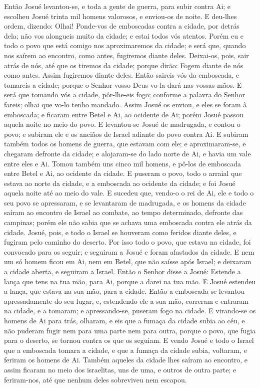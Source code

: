 Então Josué levantou-se, e toda a gente de guerra, para subir
contra Ai; e escolheu Josué trinta mil homens valorosos, e enviou-os
de noite. E deu-lhes ordem, dizendo: Olhai! Ponde-vos de
emboscadas contra a cidade, por detrás dela; não vos alongueis muito
da cidade; e estai todos vós atentos. Porém eu e todo o povo que
está comigo nos aproximaremos da cidade; e será que, quando nos
saírem ao encontro, como antes, fugiremos diante deles.
Deixai-os, pois, sair atrás de nós, até que os tiremos da
cidade; porque dirão: Fogem diante de nós como antes. Assim
fugiremos diante deles. Então saireis vós da emboscada, e
tomareis a cidade; porque o Senhor vosso Deus vo-la dará nas vossas
mãos. E será que tomando vós a cidade, pôr-lhe-eis fogo;
conforme a palavra do Senhor fareis; olhai que vo-lo tenho mandado.
Assim Josué os enviou, e eles se foram à emboscada; e ficaram
entre Betel e Ai, ao ocidente de Ai; porém Josué passou aquela noite
no meio do povo. E levantou-se Josué de madrugada, e contou o
povo; e subiram ele e os anciãos de Israel adiante do povo contra
Ai. E subiram também todos os homens de guerra, que estavam
com ele; e aproximaram-se, e chegaram defronte da cidade; e
alojaram-se do lado norte de Ai, e havia um vale entre eles e Ai.
Tomou também uns cinco mil homens, e pô-los de emboscada
entre Betel e Ai, ao ocidente da cidade. E puseram o povo,
todo o arraial que estava ao norte da cidade, e a emboscada ao
ocidente da cidade; e foi Josué aquela noite até ao meio do vale.
E sucedeu que, vendo-o o rei de Ai, ele e todo o seu povo se
apressaram, e se levantaram de madrugada, e os homens da cidade
saíram ao encontro de Israel ao combate, ao tempo determinado,
defronte das campinas; porém ele não sabia que se achava uma
emboscada contra ele atrás da cidade. Josué, pois, e todo o
Israel se houveram como feridos diante deles, e fugiram pelo caminho
do deserto. Por isso todo o povo, que estava na cidade, foi
convocado para os seguir; e seguiram a Josué e foram afastados da
cidade. E nem um só homem ficou em Ai, nem em Betel, que não
saísse após Israel; e deixaram a cidade aberta, e seguiram a Israel.
Então o Senhor disse a Josué: Estende a lança que tens na tua
mão, para Ai, porque a darei na tua mão. E Josué estendeu a lança,
que estava na sua mão, para a cidade. Então a emboscada se
levantou apressadamente do seu lugar, e, estendendo ele a sua mão,
correram e entraram na cidade, e a tomaram; e apressando-se, puseram
fogo na cidade. E virando-se os homens de Ai para trás,
olharam, e eis que a fumaça da cidade subia ao céu, e não puderam
fugir nem para uma parte nem para outra, porque o povo, que fugia
para o deserto, se tornou contra os que os seguiam. E vendo
Josué e todo o Israel que a emboscada tomara a cidade, e que a
fumaça da cidade subia, voltaram, e feriram os homens de Ai.
Também aqueles da cidade lhes saíram ao encontro, e assim
ficaram no meio dos israelitas, uns de uma, e outros de outra parte;
e feriram-nos, até que nenhum deles sobreviveu nem escapou.

